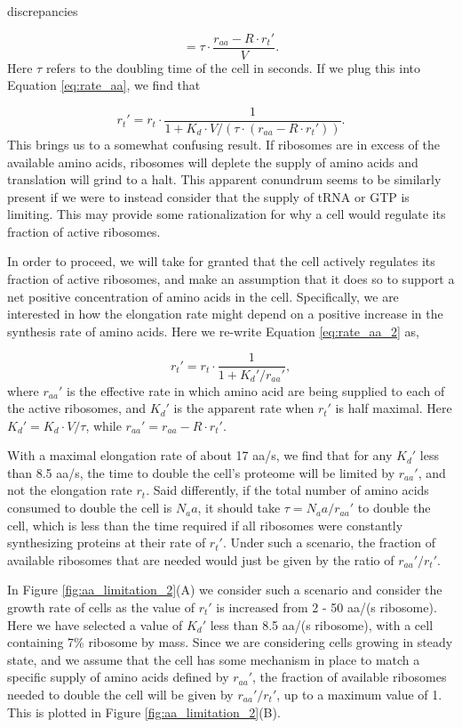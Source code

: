 discrepancies \documentclass[11pt, letterpaper]{article}
\begin{document}
\begin{equation}
[aa] =  \tau \cdot \frac{r_{aa} - R \cdot r_t'}{V}.
\label{eq:aa}
\end{equation}
Here $\tau$ refers to the doubling time of the cell in seconds. If we plug this into Equation \ref{eq:rate_aa}, we find that

\begin{equation}
r_t' = r_t \cdot \frac{1}{1 + K_d \cdot V / (\tau \cdot (r_{aa} - R \cdot r_t'))}.
\label{eq:rate_aa_2}
\end{equation}
This brings us to a somewhat confusing result. If ribosomes are in excess of the
available amino acids, ribosomes will deplete the supply of amino acids and
translation will grind to a halt. This apparent conundrum seems to be
similarly present if we were to instead consider that the supply of tRNA or GTP is
limiting. This may provide some rationalization for why a cell would
regulate its fraction of active ribosomes.

In order to proceed, we will take for granted that the cell actively regulates
its fraction of active ribosomes, and make an assumption that it does so to
support a net positive concentration of amino acids in the cell. Specifically, we are
interested in how the elongation rate might depend on a positive increase in the
synthesis rate of amino acids. Here we re-write Equation
\ref{eq:rate_aa_2} as,

\begin{equation}
r_t' = r_t \cdot \frac{1}{1 + K_d' / r_{aa}'},
\label{eq:rate_aa_3}
\end{equation}
where $r_{aa}'$ is the effective rate in which amino acid are being supplied to
each of the active ribosomes, and $K_d'$ is the apparent rate when $r_t'$ is
half maximal. Here $K_d' = K_d \cdot V / \tau$, while $r_{aa}' = r_{aa} - R \cdot
r_t'$.

With a maximal elongation rate of about 17 aa/s, we find that for any $K_d'$
less than 8.5 aa/s, the time to double the  cell's proteome will be limited by
$r_{aa}'$, and not the elongation rate $r_t$. Said differently, if
the total number of amino acids consumed to double the cell is $N_aa$, it
should take $\tau = N_aa/r_{aa}'$ to double the cell, which is less than the time
required if all ribosomes were constantly synthesizing proteins at their rate of $r_t'$.
Under such a scenario, the fraction of available ribosomes that are  needed would just be given
by the ratio of  $r_{aa}'/r_t'$.

In Figure \ref{fig:aa_limitation_2}(A) we consider such a scenario and consider the growth rate of cells
as the value of $r_t'$ is increased from 2 - 50 aa/(s ribosome). Here we have selected a value of
$K_d'$ less than 8.5 aa/(s ribosome), with a cell containing 7\% ribosome by mass.  Since we are considering cells growing in steady
state, and we assume  that the cell has some mechanism in place to match a
specific supply of amino acids defined by  $r_{aa}'$,  the fraction of available
ribosomes needed to double the cell will be given by $r_{aa}'/r_t' $, up to a maximum value of 1.
This is plotted in Figure \ref{fig:aa_limitation_2}(B).
\end{document}
